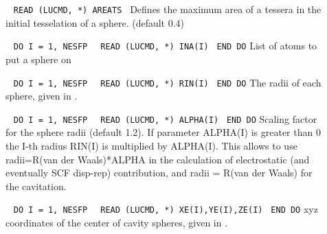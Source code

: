 \begin{description}
    
\item[]\verb| |\newline
\verb|READ (LUCMD, *) AREATS|\verb| |\newline
Defines the maximum area of a tessera in the initial tesselation of a
sphere. (default 0.4)

\item[]\verb| |\newline
\verb|DO I = 1, NESFP|\newline
\verb|  READ (LUCMD, *) INA(I)|\verb| |\newline
\verb|END DO|\newline
List of atoms to put a sphere on

\item[]\verb| |\newline
\verb|DO I = 1, NESFP|\newline
\verb|  READ (LUCMD, *) RIN(I)|\verb| |\newline
\verb|END DO|\newline
The radii of each sphere, given in \angstrom{}.

\item[]\verb| |\newline
\verb|DO I = 1, NESFP|\newline
\verb|  READ (LUCMD, *) ALPHA(I)|\verb| |\newline
\verb|END DO|\newline
Scaling factor for the sphere radii (default 1.2). If parameter
ALPHA(I) is greater than 0 the I-th radius RIN(I) is multiplied by
ALPHA(I). This allows to use radii=R(van der Waals)*ALPHA in the
calculation of electrostatic (and eventually SCF disp-rep)
contribution, and radii = R(van der Waals) for the cavitation.

\item[]\verb| |\newline
\verb|DO I = 1, NESFP|\newline
\verb|  READ (LUCMD, *) XE(I),YE(I),ZE(I)|\verb| |\newline
\verb|END DO|\newline
xyz coordinates of the center of cavity spheres, given in \angstrom{}.

\end{description}



